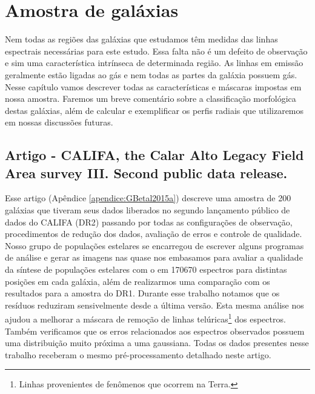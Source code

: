 


\chapter{Amostra de galáxias}
\label{sec:amostra}

Nem todas as regiões das galáxias que estudamos têm medidas das linhas espectrais necessárias para
este estudo. Essa falta não é um defeito de observação e sim uma característica intrínseca de
determinada região. As linhas em emissão geralmente estão ligadas ao gás e nem todas as partes da
galáxia possuem gás. Nesse capítulo vamos descrever todas as características e máscaras impostas em
nossa amostra. Faremos um breve comentário sobre a classificação morfológica destas galáxias, além
de calcular e exemplificar os perfis radiais que utilizaremos em nossas discussões futuras.

\section{Artigo - CALIFA, the Calar Alto Legacy Field Area survey III. Second public data
release.}

Esse artigo (Apêndice \ref{apendice:GBetal2015a}) descreve uma amostra de 200 galáxias que tiveram
seus dados liberados no segundo lançamento público de dados do CALIFA (DR2) passando por todas as
configurações de observação, procedimentos de redução dos dados, avaliação de erros e controle de
qualidade. Nosso grupo de populações estelares se encarregou de escrever alguns programas de análise
e gerar as imagens nas quase nos embasamos para avaliar a qualidade da síntese de populações
estelares com o \starlight em 170670 espectros para distintas posições em cada galáxia, além de
realizarmos uma comparação com os resultados para a amostra do DR1. Durante esse trabalho notamos
que os resíduos reduziram sensivelmente desde a última versão. Esta mesma análise nos ajudou a
melhorar a máscara de remoção de linhas telúricas\footnote{Linhas provenientes de fenômenos que
ocorrem na Terra.} dos espectros. Também verificamos que os erros relacionados aos espectros
observados possuem uma distribuição muito próxima a uma gaussiana. Todas os dados presentes nesse
trabalho receberam o mesmo pré-processamento detalhado neste artigo.

